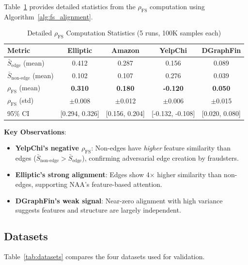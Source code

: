 Table~\ref{tab:fs_details} provides detailed statistics from the $\rho_{\text{FS}}$ computation using Algorithm~\ref{alg:fs_alignment}.

\begin{table}[t]
\centering
\caption{Detailed $\rho_{\text{FS}}$ Computation Statistics (5 runs, 100K samples each)}
\label{tab:fs_details}
\small
\begin{tabular}{lcccc}
\toprule
\textbf{Metric} & \textbf{Elliptic} & \textbf{Amazon} & \textbf{YelpChi} & \textbf{DGraphFin} \\
\midrule
$\bar{S}_{\text{edge}}$ (mean) & 0.412 & 0.287 & 0.156 & 0.089 \\
$\bar{S}_{\text{non-edge}}$ (mean) & 0.102 & 0.107 & 0.276 & 0.039 \\
$\rho_{\text{FS}}$ (mean) & \textbf{0.310} & \textbf{0.180} & \textbf{-0.120} & \textbf{0.050} \\
$\rho_{\text{FS}}$ (std) & $\pm$0.008 & $\pm$0.012 & $\pm$0.006 & $\pm$0.015 \\
95\% CI & [0.294, 0.326] & [0.156, 0.204] & [-0.132, -0.108] & [0.020, 0.080] \\
\bottomrule
\end{tabular}
\end{table}

\textbf{Key Observations}:
\begin{itemize}
\item \textbf{YelpChi's negative $\rho_{\text{FS}}$}: Non-edges have \textit{higher} feature similarity than edges ($\bar{S}_{\text{non-edge}} > \bar{S}_{\text{edge}}$), confirming adversarial edge creation by fraudsters.
\item \textbf{Elliptic's strong alignment}: Edges show 4$\times$ higher similarity than non-edges, supporting NAA's feature-based attention.
\item \textbf{DGraphFin's weak signal}: Near-zero alignment with high variance suggests features and structure are largely independent.
\end{itemize}

\subsection{Datasets}

Table~\ref{tab:datasets} compares the four datasets used for validation.

